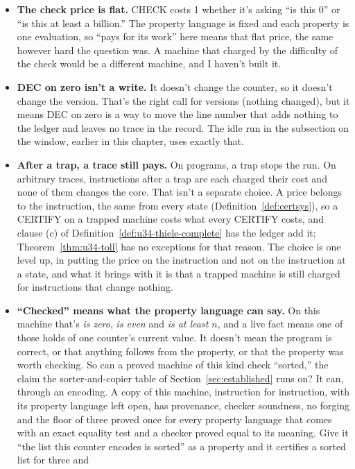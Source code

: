 \documentclass[11pt,twoside]{article}
\theoremstyle{thielethm}
\theoremstyle{thieledef}
\theoremstyle{thieledef}
\theoremstyle{thieledef}
\theoremstyle{thielethm}
\theoremstyle{thieleobs}
\theoremstyle{thielethm}
\begin{document}
\begin{itemize}
\item \textbf{The check price is flat.} CHECK costs 1 whether it's asking ``is this 0'' or ``is this at
least a billion.'' The property language is fixed and each property is one evaluation, so
``pays for its work'' here means that flat price, the same however hard the
question was. A machine that charged by the difficulty of the check would be a different
machine, and I haven't built it.
\item \textbf{DEC on zero isn't a write.} It doesn't change the counter, so it doesn't change the
version. That's the right call for versions (nothing changed), but it means DEC on zero is
a way to move the line number that adds nothing to the ledger and leaves no trace in the record. The idle run in the
subsection on the window, earlier in this chapter, uses exactly that.
\item \textbf{After a trap, a trace still pays.} On programs, a trap stops the run. On arbitrary
traces, instructions after a trap are each charged their cost and none of them changes the
core. That isn't a separate choice. A price belongs to the instruction, the same from every state
(Definition~\ref{def:certsys}), so a CERTIFY on a trapped machine costs what every CERTIFY costs, and
clause (c) of Definition~\ref{def:u34-thiele-complete} has the ledger add it; Theorem~\ref{thm:u34-toll}
has no exceptions for that reason. The choice is one level up, in putting the price on the instruction and
not on the instruction at a state, and what it brings with it is that a trapped
machine is still charged for instructions that change nothing.
\item \textbf{``Checked'' means what the property language can say.} On this machine that's \emph{is
zero}, \emph{is even} and \emph{is at least $n$}, and a live fact means one of those holds of one counter's
current value. It doesn't mean the program is correct, or that anything follows from the
property, or that the property was worth checking. So can a proved machine of this kind check
``sorted,'' the claim the sorter-and-copier table of Section~\ref{sec:established} runs on? It can, through an encoding. A copy of
this machine, instruction for instruction, with its property language left open, has provenance,
checker soundness, no forging and the floor of three proved once for every property language that
comes with an exact equality test and a checker proved equal to its meaning. Give it ``the list
this counter encodes is sorted'' as a property and it certifies a sorted list for three and

\end{itemize}
\end{document}

